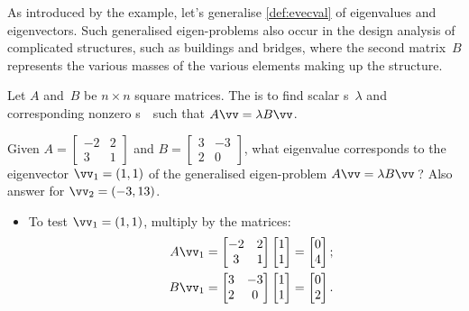 As introduced by the example, let's generalise \autoref{def:evecval} of eigenvalues and eigenvectors.
Such generalised eigen-problems also occur in the design analysis of complicated structures, such as buildings and bridges, where the second matrix~\(B\) represents the various masses of the various elements making up the structure.

\begin{definition} \label{def:geneig}
Let \(A\) and~\(B\) be \(n\times n\) square matrices. 
The  is to find scalar s~\(\lambda\) and corresponding nonzero s~\vv\ such that \(A\vv=\lambda B\vv\).
\end{definition}

\begin{example} \label{eg:}
Given \(A=\begin{bmatrix} -2&2\\3&1 \end{bmatrix}\) and \(B=\begin{bmatrix} 3&-3\\2&0 \end{bmatrix}\), what eigenvalue corresponds to the eigenvector \(\vv_1=(1,1)\) of the generalised eigen-problem \(A\vv=\lambda B\vv\)\,?  
Also answer for \(\vv_2=(-3,13)\).
\begin{solution} 
\begin{itemize}
\item To test \(\vv_1=(1,1)\), multiply by the matrices:
\begin{eqnarray*}
&&A\vv_1=\begin{bmatrix} -2&2\\3&1 \end{bmatrix}\begin{bmatrix} 1\\1 \end{bmatrix}
=\begin{bmatrix} 0\\4 \end{bmatrix};
\\&&B\vv_1=\begin{bmatrix} 3&-3\\2&0 \end{bmatrix}\begin{bmatrix} 1\\1 \end{bmatrix}
=\begin{bmatrix} 0\\2 \end{bmatrix}.

\end{eqnarray*}
\end{itemize}
\end{solution}
\end{example}
